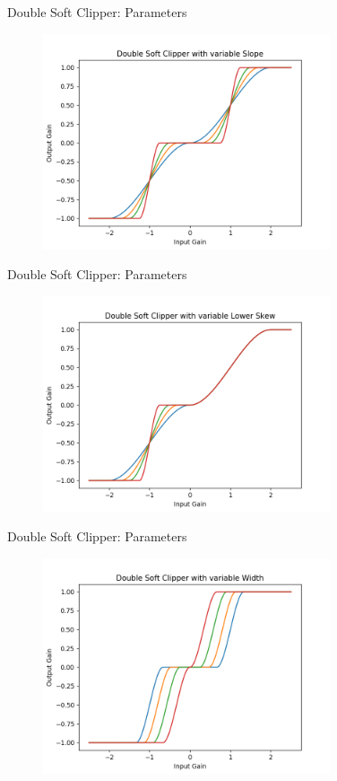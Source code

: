 \begin{frame}{Double Soft Clipper: Parameters}
    \begin{figure}
        \centering
        \includegraphics[height=2.5in]{../DoubleSoftClipper/Pics/VarSlope.png}
    \end{figure}
\end{frame}

\begin{frame}{Double Soft Clipper: Parameters}
    \begin{figure}
        \centering
        \includegraphics[height=2.5in]{../DoubleSoftClipper/Pics/VarLowSkew.png}
    \end{figure}
\end{frame}

\begin{frame}{Double Soft Clipper: Parameters}
    \begin{figure}
        \centering
        \includegraphics[height=2.5in]{../DoubleSoftClipper/Pics/VarWidth.png}
    \end{figure}
\end{frame}

